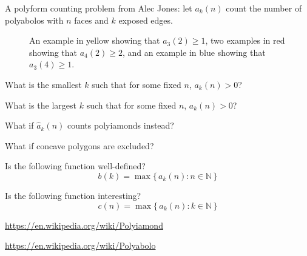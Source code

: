 \documentclass{article}
\begin{document}
  A polyform counting problem from Alec Jones: let $a_k(n)$ count the number of polyabolos with $n$ faces
  and $k$ exposed edges.
  \begin{figure}[!h]
    \centering
    \hspace{1cm}
    \hspace{1cm}
    \caption{
      An example in yellow showing that $a_3(2) \geq 1$,
      two examples in red showing that $a_4(2) \geq 2$, and
      an example in blue showing that $a_3(4) \geq 1$.
    }
  \end{figure}
\begin{question}
  What is the smallest $k$ such that for some fixed $n$, $a_k(n) > 0$?
\end{question}
\begin{related}
  \item What is the largest $k$ such that for some fixed $n$, $a_k(n) > 0$?
  \item What if $\hat{a}_k(n)$ counts polyiamonds instead?
  \item What if concave polygons are excluded?
  \item Is the following function well-defined? \[
    b(k) = \max \{\,a_k(n) : n \in \mathbb{N} \,\}
  \]
  \item Is the following function interesting? \[
    c(n) = \max \{\,a_k(n) : k \in \mathbb{N} \,\}
  \]
\end{related}
\begin{references}
  \item \url{https://en.wikipedia.org/wiki/Polyiamond}
  \item \url{https://en.wikipedia.org/wiki/Polyabolo}
\end{references}
\end{document}
